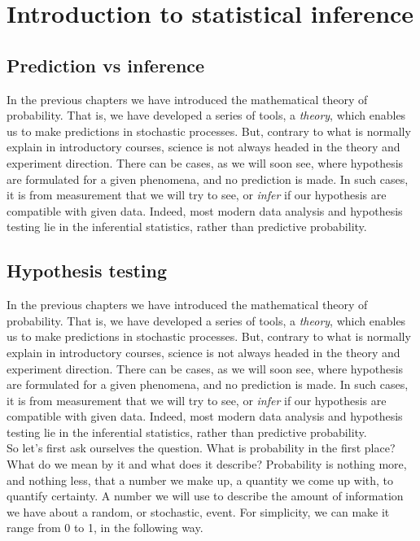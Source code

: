 \documentclass{book}
\begin{document}
\chapter{Introduction to statistical inference}

\section{Prediction vs inference}
In the previous chapters we have introduced the mathematical theory of probability. That is, we have developed a series of tools, a \textit{theory}, which enables us to make predictions in stochastic processes. But, contrary to what is normally explain in introductory courses, science is not always headed in the theory and experiment direction. There can be cases, as we will soon see, where hypothesis are formulated for a given phenomena, and no prediction is made. In such cases, it is from measurement that we will try to see, or \textit{infer} if our hypothesis are compatible with given data. Indeed, most modern data analysis and hypothesis testing lie in the inferential statistics, rather than predictive probability.

\section{Hypothesis testing}
In the previous chapters we have introduced the mathematical theory of probability. That is, we have developed a series of tools, a \textit{theory}, which enables us to make predictions in stochastic processes. But, contrary to what is normally explain in introductory courses, science is not always headed in the theory and experiment direction. There can be cases, as we will soon see, where hypothesis are formulated for a given phenomena, and no prediction is made. In such cases, it is from measurement that we will try to see, or \textit{infer} if our hypothesis are compatible with given data. Indeed, most modern data analysis and hypothesis testing lie in the inferential statistics, rather than predictive probability.\\

So let's first ask ourselves the question. What is probability in the first place? What do we mean by it and what does it describe? Probability is nothing more, and nothing less, that a number we make up, a quantity we come up with, to quantify certainty. A number we will use to describe the amount of information we have about a random, or stochastic, event. For simplicity, we can make it range from 0 to 1, in the following way.
\end{document}
